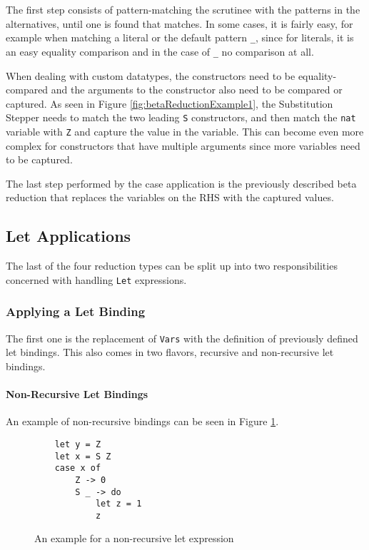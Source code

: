 The first step consists of pattern-matching the scrutinee with the patterns in the alternatives,
until one is found that matches.
In some cases, it is fairly easy,
for example when matching a literal or the default pattern \texttt{\_},
since for literals,
it is an easy equality comparison and in the case of \texttt{\_} no comparison at all.

When dealing with custom datatypes,
the constructors need to be equality-compared and the arguments to the constructor also need to be compared or captured.
As seen in Figure \ref*{fig:betaReductionExample1},
the Substitution Stepper needs to match the two leading \texttt{S} constructors,
and then match the \texttt{nat} variable with \texttt{Z} and capture the value in the variable.
This can become even more complex for constructors that have multiple arguments since more variables need to be captured.

The last step performed by the case application is the previously described beta reduction that replaces the variables on the RHS with the captured values.

\subsection{Let Applications}
The last of the four reduction types can be split up into two responsibilities concerned with handling \texttt{Let} expressions.

\subsubsection*{Applying a Let Binding}
The first one is the replacement of \texttt{Vars} with the definition of previously defined let bindings.
This also comes in two flavors, recursive and non-recursive let bindings.

\paragraph*{Non-Recursive Let Bindings}
An example of non-recursive bindings can be seen in Figure \ref*{fig:nonRecLetExample}.

\begin{figure}[!ht]
\begin{verbatim}
    let y = Z
    let x = S Z
    case x of
        Z -> 0
        S _ -> do
            let z = 1
            z
\end{verbatim}
    \caption{An example for a non-recursive let expression}
    \label{fig:nonRecLetExample}
\end{figure}

